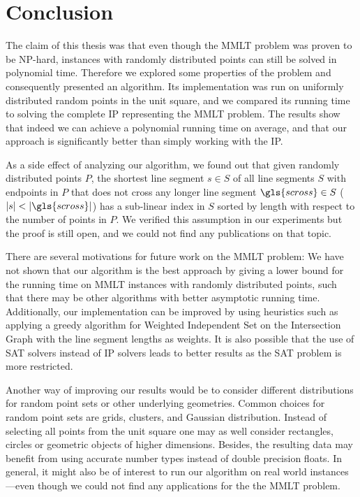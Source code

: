 \chapter{Conclusion}
The claim of this thesis was that even though the \gls{MMLT} problem
was proven to be NP-hard, instances with randomly distributed points can
still be solved in polynomial time. Therefore we explored some properties
of the problem and consequently presented an algorithm. Its implementation
was run on uniformly distributed random points in the unit square, and
we compared its running time to solving the complete \gls{IP} representing
the \gls{MMLT} problem. The results show that indeed we can achieve a polynomial
running time on average, and that our approach is significantly better than
simply working with the \gls{IP}.

As a side effect of analyzing our algorithm, we found out that given randomly
distributed points \(P\), the shortest line segment \(s \in S\) of all line
segments \(S\) with endpoints in \(P\) that does not cross any longer line
segment \(\gls{scross} \in S\) (\(|s| < |\gls{scross}|\)) has a sub-linear
index in \(S\) sorted by length with respect to the number of points in \(P\).
We verified this assumption in our experiments but the proof is still open,
and we could not find any publications on that topic.

There are several motivations for future work on the \gls{MMLT} problem:
We have not shown that our algorithm is the best approach by giving a lower
bound for the running time on \gls{MMLT} instances with randomly distributed
points, such that there may be other algorithms with better asymptotic running
time. Additionally, our implementation can be improved by using heuristics
such as applying a greedy algorithm for Weighted Independent Set on the
Intersection Graph with the line segment lengths as weights. It is also
possible that the use of SAT solvers instead of \gls{IP} solvers leads to
better results as the SAT problem is more restricted.

Another way of improving our results would be to consider different
distributions for random point sets or other underlying geometries.
Common choices for random point sets are grids, clusters, and Gaussian
distribution. Instead of selecting all points from the unit square
one may as well consider rectangles, circles or geometric objects
of higher dimensions. Besides, the resulting data may benefit from using
accurate number types instead of double precision floats. In general,
it might also be of interest to run our algorithm on real world
instances---even though we could not find any applications for the the
\gls{MMLT} problem.

